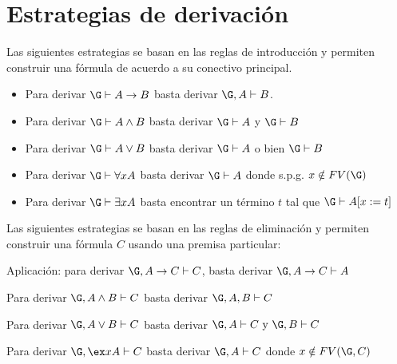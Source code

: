 \documentclass[11pt,letterpaper]{article}
\begin{document}
\section{Estrategias de derivación}
Las siguientes estrategias se basan en las reglas de introducción y permiten 
construir una fórmula de acuerdo a su conectivo principal.

\begin{itemize}
\item Para derivar $\G\vdash A\to B$ basta derivar $\G,A\vdash B$.
\vspace*{5pt}
\item Para derivar  $\G\vdash A\land B$ basta derivar $\G\vdash A$ y 
$\G\vdash B$
\vspace*{5pt}
\item Para derivar $\G\vdash A\lor B$ basta derivar $\G\vdash A$ o bien 
$\G\vdash B$
\vspace*{5pt}
\item Para derivar $\G\vdash \forall x A$ basta derivar $\G\vdash A$ donde 
s.p.g. $x\notin FV(\G)$
\vspace*{5pt}
\item Para derivar $\G\vdash \exists x A$ basta encontrar un término $t$ tal 
que $\G\vdash A[x:=t]$
\end{itemize}

Las siguientes estrategias se basan en las reglas de eliminación y permiten 
construir una fórmula $C$ usando una premisa particular:
\bi
\item Aplicación: para derivar $\G,A\to C\vdash C$, basta derivar 
$ \G,A\to C\vdash A $

\item Para derivar $\G,A\land B\vdash C$ basta derivar 
$ \G,A,B\vdash C $

\item Para derivar $\G,A\lor B\vdash C$ basta derivar
$\G,A\vdash C\text{ y }\G,B\vdash C $

\item Para derivar $\G,\ex x A\vdash C$ basta derivar 
$ \G,A\vdash C$ donde $x\notin FV(\G,C)$
\ei
\end{document}
